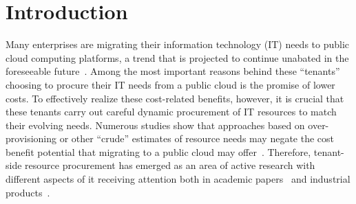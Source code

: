 \documentclass{acm_proc_article-sp}
\begin{document}
\begin{abstract}

\end{abstract}


\section{Introduction}
\vspace{10pt}


Many enterprises are migrating their information technology (IT) needs to public cloud computing platforms, a trend that is projected to continue unabated in the foreseeable future~\cite{xxx}. Among the most important reasons behind these ``tenants'' choosing to procure their IT needs from a public cloud is the promise of lower costs. To effectively realize these cost-related benefits, however, it is crucial that these tenants carry out careful dynamic procurement of IT resources to match their evolving needs. Numerous studies show that approaches based on over-provisioning or other ``crude'' estimates of resource needs may negate the cost benefit potential that migrating to a public cloud may offer~\cite{xxx}. Therefore, tenant-side resource procurement has emerged as an area of active research with different aspects of it receiving attention both in academic papers~\cite{xxx} and industrial products~\cite{xxx}. 
\end{document}
